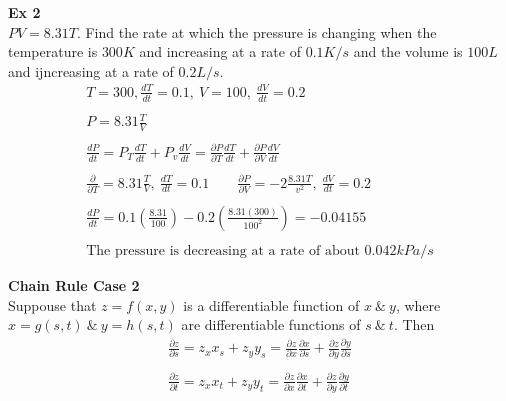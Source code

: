 \documentclass{article}
\begin{document}
  \textbf{Ex 2}\\
  $ PV =8.31T$. Find the rate at which the pressure is changing when the temperature is $ 300K $ and increasing at a rate of $ 0.1K/s $ and the volume is $ 100L $ and ijncreasing at a rate of $ 0.2L/s $.
  \[
    \begin{gathered}
    T=300, \frac{dT}{dt}=0.1,~V=100,~\frac{dV}{dt}=0.2\\
    ~\\
    P=8.31\frac{T}{V} \\
    ~\\
  \frac{dP}{dt}= P_{T}\frac{dT}{dt}+ P_{v}\frac{dV}{dt} = \frac{\partial P}{\partial T} \frac{dT}{dt}+\frac{\partial P}{\partial V} \frac{dV}{dt}\\
  ~\\
  \frac{\partial}{\partial T}= 8.31\frac{T}{V},~\frac{dT}{dt}= 0.1  \qquad \frac{\partial P}{\partial V}=-2\frac{8.31T}{v^{2} },~\frac{dV}{dt} =0.2\\
  ~\\
  \frac{dP}{dt} = 0.1 (\frac{8.31}{100}) -0.2(\frac{8.31(300)}{100^{2}})=\boxed{-0.04155}\\
  ~\\
  \text{The pressure is decreasing at a rate of about } 0.042kPa/s  
    \end{gathered}
  \]
 
  \textbf{Chain Rule Case 2}\\
  Suppouse that $ z=f(x,y) $ is a differentiable function of $ x ~\&~ y $, where $ x=g(s,t) ~\&~ y=h(s,t)$ are differentiable functions of $ s ~\&~ t $. Then
  \[
    \begin{gathered}
    \frac{\partial z}{\partial s} = z_{x}x_{s}+z_{y}y_{s} = \frac{\partial z}{\partial x} \frac{\partial x}{\partial s} +\frac{\partial z}{\partial y} \frac{\partial y}{\partial s}\\
    ~\\
    \frac{\partial z}{\partial t} = z_{x} x_{t}+z_{y}y_{t} = \frac{\partial z}{\partial x} \frac{\partial x}{\partial t} + \frac{\partial z}{\partial y} \frac{\partial y}{\partial t}    
    \end{gathered}
  \]
\end{document}
